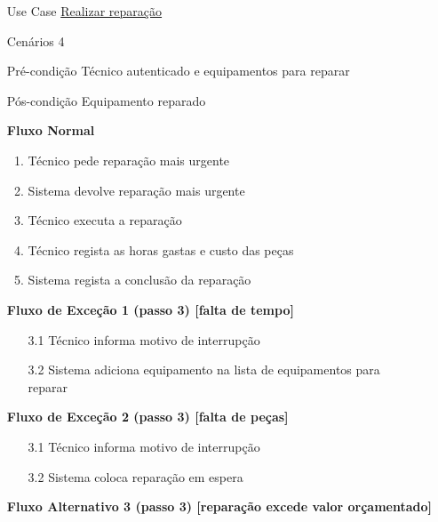 \documentclass[../relatorio.tex]{subfiles}
\begin{document}
\begin{itemize}
    \item[Use Case] {\underline{Realizar reparação}}
    \item[Cenários] {4}
    \item[Pré-condição] {Técnico autenticado e equipamentos para reparar}
    \item[Pós-condição] {Equipamento reparado}
          \begin{flushleft}
              \textbf{Fluxo Normal}
          \end{flushleft}
          \begin{enumerate}
              \item Técnico pede reparação mais urgente
              \item Sistema devolve reparação mais urgente
              \item Técnico executa a reparação
              \item Técnico regista as horas gastas e custo das peças
              \item Sistema regista a conclusão da reparação
          \end{enumerate}
          \begin{flushleft}
              \textbf{Fluxo de Exceção 1 (passo 3) [falta de tempo]}
          \end{flushleft}
          \begin{itemize}
              \item[3.1]{Técnico informa motivo de interrupção}
              \item[3.2]{Sistema adiciona equipamento na lista de equipamentos para \\
                         reparar}
          \end{itemize}
          \begin{flushleft}
              \textbf{Fluxo de Exceção 2 (passo 3) [falta de peças]}
          \end{flushleft}
          \begin{itemize}
              \item[3.1]{Técnico informa motivo de interrupção}
              \item[3.2]{Sistema coloca reparação em espera}
          \end{itemize}
          \begin{flushleft}
              \textbf{Fluxo Alternativo 3 (passo 3) [reparação excede valor orçamentado]}

\end{flushleft}
\end{itemize}
\end{document}
